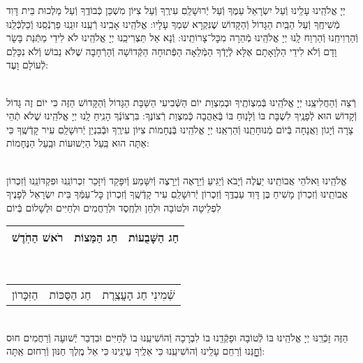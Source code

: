 \documentclass[twoside, openany, parskip=half, 11pt]{book}
\begin{document}
\begin{sometimes}
יְיָ אֱלֹהֵֽינוּ עָלֵֽינוּ וְֿעַל יִשְׂרָאֵל עַמֶּךָ וְֿעַל יְֿרוּשָׁלַֽםִ עִירֶֽךָ וְֿעַל צִיּוֹן מִשְׁכַּן כְּֿבוֹדֶֽךָ וְֿעַל מַלְכוּת בֵּית דָּוִד מְֿשִׁיחֶֽךָ וְֿעַל הַבַּֽיִת הַגָּדוֹל וְֿהַקָּדוֹשׁ שֶׁנִּקְרָא שִׁמְךָ עָלָיו: אֱלֹהֵֽינוּ אָבִֽינוּ רְֿעֵֽנוּ זוּנֵֽנוּ פַרְנְֿסֵֽנוּ וְֿכַלְכְּֿלֵֽנוּ וְֿהַרְוִיחֵֽנוּ וְֿהַרְוַח לָֽנוּ יְיָ אֱלֹהֵֽינוּ מְֿהֵרָה מִכׇּל־צָרוֹתֵֽינוּ: וְֿנָא אַל תַּצְרִיכֵֽנוּ יְיָ אֱלֹהֵֽינוּ לֹא לִידֵי מַתְּֿנַת בָּשָׂר וָדָם וְֿלֹא לִידֵי הַלְוָאָתָם אֶלָּא לְֿיָדְֿךָ הַמְּֿלֵאָה הַפְּֿתוּחָה הַקְּֿדוֹשָׁה וְֿהָרְֿחָבָה שֶׁלֹּא נֵבוֹשׁ וְֿלֹא נִכָּלֵם לְֿעוֹלָם וָעֶד:

\enlargethispage{\baselineskip}

\vspace{-.25\baselineskip}
\begin{sometimes}

\shabbos\\
רְֿצֵה וְֿהַחֲלִיצֵֽנוּ יְיָ אֱלֹהֵֽינוּ בְּֿמִצְוֹתֶֽיךָ וּבְמִצְוַת יוֹם הַשְּֿׁבִיעִי הַשַּׁבָּת הַגָּדוֹל וְֿהַקָּדוֹשׁ הַזֶּה כִּי יוֹם זֶה גָּדוֹל וְֿקָדוֹשׁ הוּא לְֿפָנֶֽיךָ לִשְׁבָּת בּוֹ וְֿלָנֽוּחַ בּוֹ בְּֿאַהֲבָה כְּֿמִצְוַת רְֿצוֹנֶךָ: בִּרְצוֹנְֿךָ הָנִֽיחַ לָֽנוּ יְיָ אֱלֹהֵֽינוּ שֶׁלֹא תְֿהֵי צָרָה וְֿיָגוֹן וַאֲנָחָה בְּֿיוֹם מְֿנוּחָתֵֽנוּ וְֿהַרְאֵֽנוּ יְיָ אֱלֹהֵֽינוּ בְּֿנֶחָמוֹת צִיּוֹן עִירֶֽךָ וּבְֿבִנְיַן יְֿרוּשָׁלַֽםִ עִיר קָדְֿשֶֽׁךָ כִּי אַתָּה הוּא בַּֽעַל הַיְשׁוּעוֹת וּבַֽעַל הַנֶּחָמוֹת:


\sepline %

\vspace{-.25\baselineskip}
\\
אֱלֹהֵֽינוּ וֵאלֹהֵי אֲבוֹתֵֽינוּ יַעֲלֶה וְֿיָבֹא וְֿיַגִּיעַ וְֿיֵרָאֶה וְֿיֵרָצֶה וְֿיִשָּׁמַע וְֿיִפָּקֵד וְֿיִזָּכֵר זִכְרוֹנֵֽנוּ וּפִקְדּוֹנֵֽנוּ וְֿזִכְרוֹן אֲבוֹתֵֽינוּ וְֿזִכְרוֹן מָשִׁיחַ בֶּן דָּוִד עַבְדֶּֽךָ וְֿזִכְרוֹן יְֿרוּשָׁלַֽםִ עִיר קָדְֿשֶֽׁךָ וְֿזִכְרוֹן כׇּל־עַמְּֿךָ בֵּית יִשְׂרָאֵל לְֿפָנֶיךָ לִפְלֵיטָה וּלְטוֹבָה וּלְחֵן וּלְחֶֽסֶד וּלְרַחֲמִים וּלְחַיִּים וּלְשָׁלוֹם בְּֿיוֹם\\
\begin{tabular}{c|c|c}
רֹאשׁ הַחֹֽדֶשׁ & חַג הַמַּצוֹת & חַג הַשָּׁבֻעוֹת\\ \hline
\end{tabular}\\
\begin{tabular}{c|c|c}
הַזִּכָּרוֹן & חַג הַסֻּכּוֹת & שְֿׁמִינִי חַג הָעֲצֶֽרֶת
\end{tabular}\\
הַזֶּה זָכְֿרֵֽנּוּ יְיָ אֱלֹהֵֽינוּ בּוֹ לְֿטוֹבָה וּפָקְֿדֵֽנוּ בוֹ לִבְרָכָה וְֿהוֹשִׁיעֵֽנוּ בוֹ לְֿחַיִּים וּבִדְבַר יְֿשׁוּעָה וְֿרַחֲמִים חוּס וְֿחׇׇׇׇׇׇָנֵּנוּ וְֿרַחֵם עָלֵֽינוּ וְֿהוֹשִׁיעֵֽנוּ כִּי אֵלֶֽיךָ עֵינֵֽינוּ כִּי אֵל מֶֽלֶךְ חַנּוּן וְֿרַחוּם אַֽתָּה:


\end{sometimes}
\end{sometimes}
\end{document}
